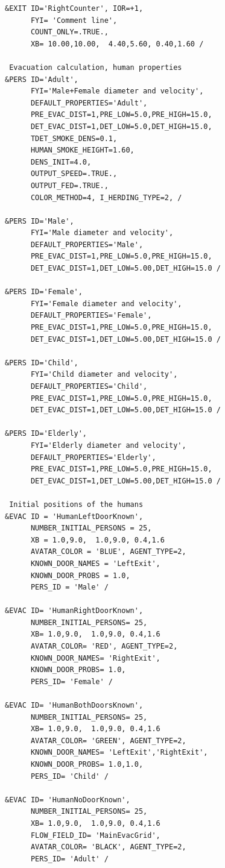 \documentclass[12pt,a4paper,final,twoside]{stylevk}
\begin{document}
{\begin{verbatim}
&EXIT ID='RightCounter', IOR=+1,
      FYI= 'Comment line',
      COUNT_ONLY=.TRUE.,
      XB= 10.00,10.00,  4.40,5.60, 0.40,1.60 /

 Evacuation calculation, human properties
&PERS ID='Adult',
      FYI='Male+Female diameter and velocity',
      DEFAULT_PROPERTIES='Adult',
      PRE_EVAC_DIST=1,PRE_LOW=5.0,PRE_HIGH=15.0,
      DET_EVAC_DIST=1,DET_LOW=5.0,DET_HIGH=15.0,
      TDET_SMOKE_DENS=0.1,
      HUMAN_SMOKE_HEIGHT=1.60,
      DENS_INIT=4.0,
      OUTPUT_SPEED=.TRUE.,
      OUTPUT_FED=.TRUE.,
      COLOR_METHOD=4, I_HERDING_TYPE=2, /

&PERS ID='Male',
      FYI='Male diameter and velocity',
      DEFAULT_PROPERTIES='Male',
      PRE_EVAC_DIST=1,PRE_LOW=5.0,PRE_HIGH=15.0,
      DET_EVAC_DIST=1,DET_LOW=5.00,DET_HIGH=15.0 /

&PERS ID='Female',
      FYI='Female diameter and velocity',
      DEFAULT_PROPERTIES='Female',
      PRE_EVAC_DIST=1,PRE_LOW=5.0,PRE_HIGH=15.0,
      DET_EVAC_DIST=1,DET_LOW=5.00,DET_HIGH=15.0 /

&PERS ID='Child',
      FYI='Child diameter and velocity',
      DEFAULT_PROPERTIES='Child',
      PRE_EVAC_DIST=1,PRE_LOW=5.0,PRE_HIGH=15.0,
      DET_EVAC_DIST=1,DET_LOW=5.00,DET_HIGH=15.0 /

&PERS ID='Elderly',
      FYI='Elderly diameter and velocity',
      DEFAULT_PROPERTIES='Elderly',
      PRE_EVAC_DIST=1,PRE_LOW=5.0,PRE_HIGH=15.0,
      DET_EVAC_DIST=1,DET_LOW=5.00,DET_HIGH=15.0 /

 Initial positions of the humans
&EVAC ID = 'HumanLeftDoorKnown', 
      NUMBER_INITIAL_PERSONS = 25,
      XB = 1.0,9.0,  1.0,9.0, 0.4,1.6
      AVATAR_COLOR = 'BLUE', AGENT_TYPE=2,
      KNOWN_DOOR_NAMES = 'LeftExit',
      KNOWN_DOOR_PROBS = 1.0,
      PERS_ID = 'Male' / 

&EVAC ID= 'HumanRightDoorKnown', 
      NUMBER_INITIAL_PERSONS= 25,
      XB= 1.0,9.0,  1.0,9.0, 0.4,1.6
      AVATAR_COLOR= 'RED', AGENT_TYPE=2,
      KNOWN_DOOR_NAMES= 'RightExit',
      KNOWN_DOOR_PROBS= 1.0,
      PERS_ID= 'Female' / 

&EVAC ID= 'HumanBothDoorsKnown', 
      NUMBER_INITIAL_PERSONS= 25,
      XB= 1.0,9.0,  1.0,9.0, 0.4,1.6
      AVATAR_COLOR= 'GREEN', AGENT_TYPE=2,
      KNOWN_DOOR_NAMES= 'LeftExit','RightExit',
      KNOWN_DOOR_PROBS= 1.0,1.0,
      PERS_ID= 'Child' / 

&EVAC ID= 'HumanNoDoorKnown', 
      NUMBER_INITIAL_PERSONS= 25,
      XB= 1.0,9.0,  1.0,9.0, 0.4,1.6
      FLOW_FIELD_ID= 'MainEvacGrid',
      AVATAR_COLOR= 'BLACK', AGENT_TYPE=2,
      PERS_ID= 'Adult' / 


\end{verbatim}}
\end{document}

